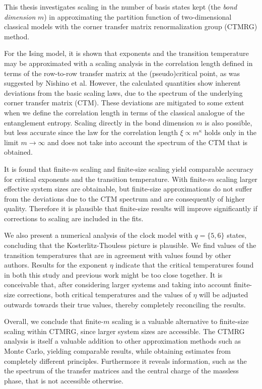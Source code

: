 \noindent This thesis investigates scaling in the number of basis states
kept (the \emph{bond dimension} $m$) in approximating the partition function
of two-dimensional classical models with the corner transfer matrix
renormalization group (CTMRG) method.

For the Ising model, it is shown that exponents and the transition temperature may be approximated with a scaling
analysis in the correlation length defined in terms of the row-to-row transfer matrix at the (pseudo)critical point,
as was suggested by Nishino et al.
However, the calculated quantities show inherent deviations from the basic scaling laws,
due to the spectrum of the underlying corner transfer matrix (CTM).
These deviations are mitigated to some extent when we define the correlation length in terms of the classical analogue
of the entanglement entropy.
Scaling directly in the bond dimension $m$ is also possible, but less accurate since the law for the correlation length
$\xi \propto m^{\kappa}$ holds only in the limit $m \to \infty$ and does not take into account the spectrum of the CTM
that is obtained.

It is found that finite-$m$ scaling and finite-size scaling yield comparable accuracy for critical exponents and the
transition temperature.
With finite-$m$ scaling larger effective system sizes are obtainable,
but finite-size approximations do not suffer from the deviations due to the CTM spectrum and are
consequently of higher quality. Therefore it is plausible that finite-size results will improve significantly if
corrections to scaling are included in the fits.

We also present a numerical analysis of the clock model with $q = \{5,
6\}$ states, concluding that the Kosterlitz-Thouless picture is plausible.
We find values of the transition temperatures that are in agreement with values found by other authors.
Results for the exponent $\eta$ indicate that the critical temperatures found in both this study and previous work might
be too close together.
It is conceivable that, after considering larger systems and taking into account finite-size corrections,
both critical temperatures and the values of $\eta$ will be adjusted outwards towards their true values,
thereby completely reconciling the results.

Overall, we conclude that finite-$m$ scaling is a valuable alternative to finite-size scaling within CTMRG,
since larger system sizes are accessible.
The CTMRG analysis is itself a valuable addition to other approximation methods such as Monte Carlo,
yielding comparable results, while obtaining estimates from completely different principles.
Furthermore it reveals information, such as the the spectrum of the transfer matrices and the central charge of the
massless phase, that is not accessible otherwise.
